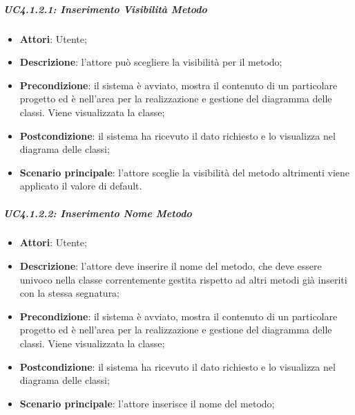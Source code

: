 \subparagraph{UC4.1.2.1: Inserimento Visibilità Metodo}
\label{UC4.1.2.1}
\begin{itemize}
	\item \textbf{Attori}: Utente;
	\item \textbf{Descrizione}: l'attore può scegliere la visibilità per il metodo;
	\item \textbf{Precondizione}:  il sistema è avviato, mostra il contenuto di un particolare progetto ed è nell'area per la realizzazione e gestione del diagramma delle classi. Viene visualizzata la classe;
	\item \textbf{Postcondizione}: il sistema ha ricevuto il dato richiesto e lo visualizza nel diagrama delle classi;
	\item \textbf{Scenario principale}: l'attore sceglie la visibilità del metodo altrimenti viene applicato il valore di default.
\end{itemize}

\subparagraph{UC4.1.2.2: Inserimento Nome Metodo}
\label{UC4.1.2.2}
\begin{itemize}
	\item \textbf{Attori}: Utente;
	\item \textbf{Descrizione}: l'attore deve inserire il nome del metodo, che deve essere univoco nella classe correntemente gestita rispetto ad altri metodi già inseriti con la stessa segnatura;
	\item \textbf{Precondizione}: il sistema è avviato, mostra il contenuto di un particolare progetto ed è nell'area per la realizzazione e gestione del diagramma delle classi. Viene visualizzata la classe;
	\item \textbf{Postcondizione}: il sistema ha ricevuto il dato richiesto e lo visualizza nel diagrama delle classi;
	\item \textbf{Scenario principale}: l'attore inserisce il nome del metodo;
\end{itemize}


